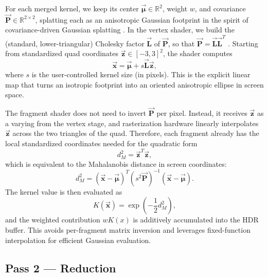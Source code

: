 \documentclass[10pt,conference]{IEEEtran}
\begin{document}
For each merged kernel, we keep its center $\overrightarrow{\boldsymbol{\mu}}\in\mathbb{R}^2$, weight $w$, and covariance $\overrightarrow{\mathbf{P}}\in\mathbb{R}^{2\times 2}$, splatting each as an anisotropic Gaussian footprint in the spirit of covariance-driven Gaussian splatting \cite{10.1145/3592433}. In the vertex shader, we build the (standard, lower-triangular) Cholesky factor $\overrightarrow{\mathbf{L}}$ of $\overrightarrow{\mathbf{P}}$, so that $\overrightarrow{\mathbf{P}} = \overrightarrow{\mathbf{L}}\overrightarrow{\mathbf{L}}^T$ \cite{Bishop2006}. Starting from standardized quad coordinates $\overrightarrow{\boldsymbol{z}}\in[-3,3]^2$, the shader computes
\begin{equation}
\overrightarrow{\boldsymbol{x}} = \overrightarrow{\boldsymbol{\mu}} + s\overrightarrow{\mathbf{L}}\overrightarrow{\boldsymbol{z}},
\end{equation}
where $s$ is the user-controlled kernel size (in pixels). This is the explicit linear map that turns an isotropic footprint into an oriented anisotropic ellipse in screen space.

The fragment shader does not need to invert $\overrightarrow{\mathbf{P}}$ per pixel. Instead, it receives $\overrightarrow{\boldsymbol{z}}$ as a varying from the vertex stage, and rasterization hardware linearly interpolates $\overrightarrow{\boldsymbol{z}}$ across the two triangles of the quad. Therefore, each fragment already has the local standardized coordinates needed for the quadratic form
\begin{equation}
d_M^2 = \overrightarrow{\boldsymbol{z}}^T\overrightarrow{\boldsymbol{z}},
\end{equation}
which is equivalent to the Mahalanobis distance in screen coordinates:
\begin{equation}
d_M^2 = (\overrightarrow{\boldsymbol{x}}-\overrightarrow{\boldsymbol{\mu}})^T (s^2\overrightarrow{\mathbf{P}})^{-1}(\overrightarrow{\boldsymbol{x}}-\overrightarrow{\boldsymbol{\mu}}).
\end{equation}
The kernel value is then evaluated as
\begin{equation}
K(\overrightarrow{\boldsymbol{x}})=\exp\left(-\frac{1}{2}d_M^2\right),
\end{equation}
and the weighted contribution $wK(x)$ is additively accumulated into the HDR buffer. This avoids per-fragment matrix inversion and leverages fixed-function interpolation for efficient Gaussian evaluation.

\subsection{Pass 2 --- Reduction}
\end{document}
